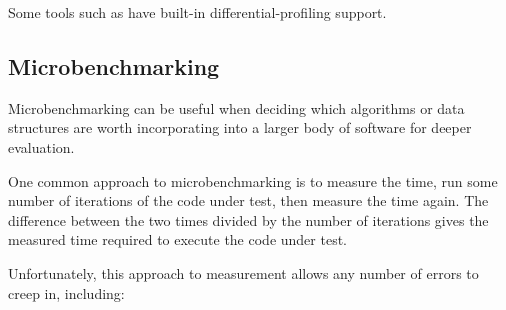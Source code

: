 Some tools such as  have built-in differential-profiling
support.

\subsection{Microbenchmarking}
\label{sec:debugging:Microbenchmarking}

Microbenchmarking can be useful when deciding which algorithms or
data structures are worth incorporating into a larger body of software
for deeper evaluation.

One common approach to microbenchmarking is to measure the time,
run some number of iterations of the code
under test, then measure the time again.
The difference between the two times divided by the number of iterations
gives the measured time required to execute the code under test.

Unfortunately, this approach to measurement allows any number of errors
to creep in, including:

